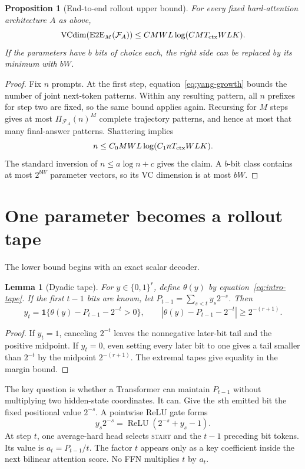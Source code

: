 \documentclass{article}
\newtheorem{proposition}[theorem]{Proposition}
\newtheorem{lemma}[theorem]{Lemma}
\newcommand{\1}{\mathbf 1}
\newcommand{\VC}{\operatorname{VCdim}}
\newcommand{\EtoE}{\operatorname{E2E}}
\begin{document}
\begin{proposition}[End-to-end rollout upper bound]\label{prop:upper}
For every fixed hard-attention architecture $A$ as above,
\[
 \VC(\EtoE_M(\mathcal F_A))
 \leq CMWL\log(CMT_{\rm ctx}WLK).
\]
If the parameters have $b$ bits of choice each, the right side can be replaced by its minimum with
$bW$.
\end{proposition}

\begin{proof}
Fix $n$ prompts. At the first step, equation~\eqref{eq:yang-growth} bounds the number of joint
next-token patterns. Within any resulting pattern, all $n$ prefixes for step two are fixed, so the
same bound applies again. Recursing for $M$ steps gives at most
$\Pi_{\mathcal F_A}(n)^M$ complete trajectory patterns, and hence at most that many final-answer
patterns. Shattering implies
\[
 n\leq C_0MWL\log(C_1nT_{\rm ctx}WLK).
\]
The standard inversion of $n\leq a\log n+c$ gives the claim. A $b$-bit class contains at most
$2^{bW}$ parameter vectors, so its VC dimension is at most $bW$.
\end{proof}

\section{One parameter becomes a rollout tape}

The lower bound begins with an exact scalar decoder.

\begin{lemma}[Dyadic tape]\label{lem:tape}
For $y\in\{0,1\}^r$, define $\theta(y)$ by equation~\eqref{eq:intro-tape}. If the first $t-1$
bits are known, let $P_{t-1}=\sum_{s<t}y_s2^{-s}$. Then
\begin{equation}
 y_t=\1\{\theta(y)-P_{t-1}-2^{-t}>0\},
 \qquad
 \left|\theta(y)-P_{t-1}-2^{-t}\right|\geq2^{-(r+1)}.
 \label{eq:tape-decode}
\end{equation}
\end{lemma}

\begin{proof}
If $y_t=1$, canceling $2^{-t}$ leaves the nonnegative later-bit tail and the positive midpoint. If
$y_t=0$, even setting every later bit to one gives a tail smaller than $2^{-t}$ by the midpoint
$2^{-(r+1)}$. The extremal tapes give equality in the margin bound.
\end{proof}

The key question is whether a Transformer can maintain $P_{t-1}$ without multiplying two
hidden-state coordinates. It can. Give the $s$th emitted bit the fixed positional value $2^{-s}$.
A pointwise ReLU gate forms
\begin{equation}
 y_s2^{-s}=\operatorname{ReLU}(2^{-s}+y_s-1).
 \label{eq:relu-product}
\end{equation}
At step $t$, one average-hard head selects \textsc{start} and the $t-1$ preceding bit tokens. Its
value is $a_t=P_{t-1}/t$. The factor $t$ appears only as a key coefficient inside the next
bilinear attention score. No FFN multiplies $t$ by $a_t$.
\end{document}
